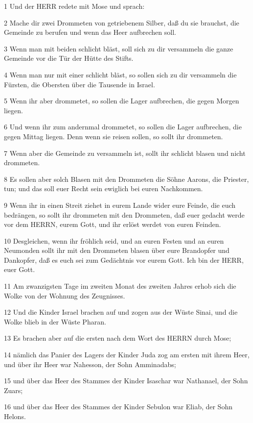 \par 1 Und der HERR redete mit Mose und sprach:
\par 2 Mache dir zwei Drommeten von getriebenem Silber, daß du sie brauchst, die Gemeinde zu berufen und wenn das Heer aufbrechen soll.
\par 3 Wenn man mit beiden schlicht bläst, soll sich zu dir versammeln die ganze Gemeinde vor die Tür der Hütte des Stifts.
\par 4 Wenn man nur mit einer schlicht bläst, so sollen sich zu dir versammeln die Fürsten, die Obersten über die Tausende in Israel.
\par 5 Wenn ihr aber drommetet, so sollen die Lager aufbrechen, die gegen Morgen liegen.
\par 6 Und wenn ihr zum andernmal drommetet, so sollen die Lager aufbrechen, die gegen Mittag liegen. Denn wenn sie reisen sollen, so sollt ihr drommeten.
\par 7 Wenn aber die Gemeinde zu versammeln ist, sollt ihr schlicht blasen und nicht drommeten.
\par 8 Es sollen aber solch Blasen mit den Drommeten die Söhne Aarons, die Priester, tun; und das soll euer Recht sein ewiglich bei euren Nachkommen.
\par 9 Wenn ihr in einen Streit ziehet in eurem Lande wider eure Feinde, die euch bedrängen, so sollt ihr drommeten mit den Drommeten, daß euer gedacht werde vor dem HERRN, eurem Gott, und ihr erlöst werdet von euren Feinden.
\par 10 Desgleichen, wenn ihr fröhlich seid, und an euren Festen und an euren Neumonden sollt ihr mit den Drommeten blasen über eure Brandopfer und Dankopfer, daß es euch sei zum Gedächtnis vor eurem Gott. Ich bin der HERR, euer Gott.
\par 11 Am zwanzigsten Tage im zweiten Monat des zweiten Jahres erhob sich die Wolke von der Wohnung des Zeugnisses.
\par 12 Und die Kinder Israel brachen auf und zogen aus der Wüste Sinai, und die Wolke blieb in der Wüste Pharan.
\par 13 Es brachen aber auf die ersten nach dem Wort des HERRN durch Mose;
\par 14 nämlich das Panier des Lagers der Kinder Juda zog am ersten mit ihrem Heer, und über ihr Heer war Nahesson, der Sohn Amminadabs;
\par 15 und über das Heer des Stammes der Kinder Isaschar war Nathanael, der Sohn Zuars;
\par 16 und über das Heer des Stammes der Kinder Sebulon war Eliab, der Sohn Helons.
